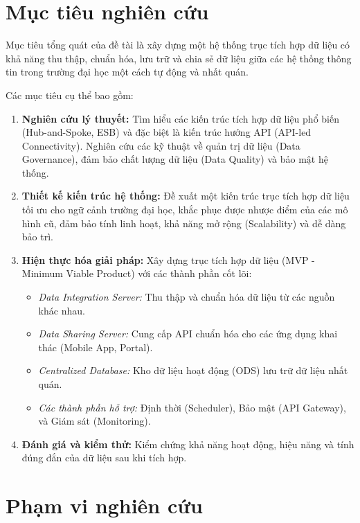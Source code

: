 \section{Mục tiêu nghiên cứu}

Mục tiêu tổng quát của đề tài là xây dựng một hệ thống trục tích hợp dữ liệu có khả năng thu thập, chuẩn hóa, lưu trữ và chia sẻ dữ liệu giữa các hệ thống thông tin trong trường đại học một cách tự động và nhất quán.

Các mục tiêu cụ thể bao gồm:

\begin{enumerate}
    \item \textbf{Nghiên cứu lý thuyết:} Tìm hiểu các kiến trúc tích hợp dữ liệu phổ biến (Hub-and-Spoke, ESB) và đặc biệt là kiến trúc hướng API (API-led Connectivity). Nghiên cứu các kỹ thuật về quản trị dữ liệu (Data Governance), đảm bảo chất lượng dữ liệu (Data Quality) và bảo mật hệ thống.
    \item \textbf{Thiết kế kiến trúc hệ thống:} Đề xuất một kiến trúc trục tích hợp dữ liệu tối ưu cho ngữ cảnh trường đại học, khắc phục được nhược điểm của các mô hình cũ, đảm bảo tính linh hoạt, khả năng mở rộng (Scalability) và dễ dàng bảo trì.
    \item \textbf{Hiện thực hóa giải pháp:} Xây dựng trục tích hợp dữ liệu (MVP - Minimum Viable Product) với các thành phần cốt lõi:
    \begin{itemize}
        \item \textit{Data Integration Server:} Thu thập và chuẩn hóa dữ liệu từ các nguồn khác nhau.
        \item \textit{Data Sharing Server:} Cung cấp API chuẩn hóa cho các ứng dụng khai thác (Mobile App, Portal).
        \item \textit{Centralized Database:} Kho dữ liệu hoạt động (ODS) lưu trữ dữ liệu nhất quán.
        \item \textit{Các thành phần hỗ trợ:} Định thời (Scheduler), Bảo mật (API Gateway), và Giám sát (Monitoring).
    \end{itemize}
    \item \textbf{Đánh giá và kiểm thử:} Kiểm chứng khả năng hoạt động, hiệu năng và tính đúng đắn của dữ liệu sau khi tích hợp.
\end{enumerate}

\section{Phạm vi nghiên cứu}


